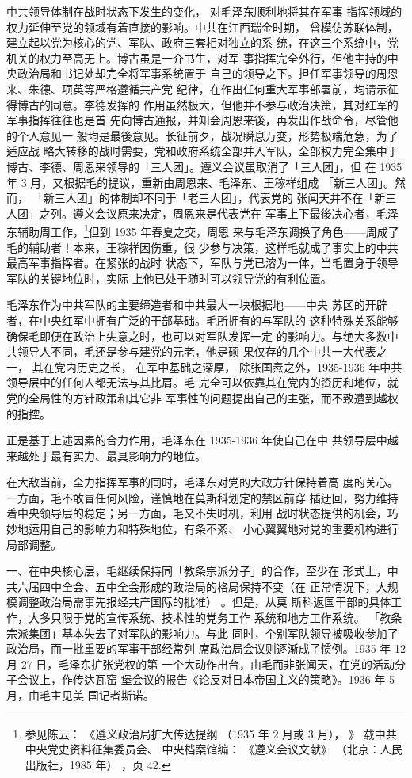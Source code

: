 中共领导体制在战时状态下发生的变化，
对毛泽东顺利地将其在军事
指挥领域的权力延伸至党的领域有着直接的影响。中共在江西瑞金时期，
曾模仿苏联体制，建立起以党为核心的党、军队、政府三套相对独立的系
统，在这三个系统中，党机关的权力至高无上。博古虽是一介书生，对军
事指挥完全外行，但他主持的中央政治局和书记处却完全将军事系统置于
自己的领导之下。担任军事领导的周恩来、朱德、项英等严格遵循共产党
纪律，在作出任何重大军事部署前，均请示征得博古的同意。李德发挥的
作用虽然极大，但他并不参与政治决策，其对红军的军事指挥往往也是首
先向博古通报，并知会周恩来後，再发出作战命令，尽管他的个人意见一
般均是最後意见。长征前夕，战况瞬息万变，形势极端危急，为了适应战
略大转移的战时需要，党和政府系统全部并入军队，全部权力完全集中于
博古、李德、周恩来领导的「三人团」。遵义会议虽取消了「三人团」，但
在 1935 年 3 月，又根据毛的提议，重新由周恩来、毛泽东、王稼祥组成
「新三人团」。然而， 「新三人团」的体制却不同于「老三人团」，代表党的
张闻天并不在「新三人团」之列。遵义会议原来决定，周恩来是代表党在
军事上下最後决心者，毛泽东辅助周工作，\footnote{参见陈云：
《遵义政治局扩大传达提纲
（1935 年 2 月或 3 月），
》 载中共中央党史资料征集委员会、
中央档案馆编：
《遵义会议文献》
（北京：人民出版社，1985 年）
，页 42.}但到 1935 年春夏之交，周恩
来与毛泽东调换了角色——周成了毛的辅助者！本来，王稼祥因伤重，很
少参与决策，这样毛就成了事实上的中共最高军事指挥者。在紧张的战时
状态下，军队与党已溶为一体，当毛置身于领导军队的关键地位时，实际
上他已处于随时可以领导党的有利位置。
 
毛泽东作为中共军队的主要缔造者和中共最大一块根据地——中央
苏区的开辟者，在中央红军中拥有广泛的干部基础。毛所拥有的与军队的
这种特殊关系能够确保毛即便在政治上失意之时，也可以对军队发挥一定
的影响力。与绝大多数中共领导人不同，毛还是参与建党的元老，他是硕
果仅存的几个中共一大代表之一，
其在党内历史之长，
在军中基础之深厚，
除张国焘之外，1935-1936 年中共领导层中的任何人都无法与其比肩。毛
完全可以依靠其在党内的资历和地位，就党的全局性的方针政策和其它非
军事性的问题提出自己的主张，而不致遭到越权的指控。

正是基于上述因素的合力作用，毛泽东在 1935-1936 年使自己在中
共领导层中越来越处于最有实力、最具影响力的地位。

在大敌当前，全力指挥军事的同时，毛泽东对党的大政方针保持着高
度的关心。一方面，毛不敢冒任何风险，谨慎地在莫斯科划定的禁区前穿
插迂回，努力维持着中央领导层的稳定；另一方面，毛又不失时机，利用
战时状态提供的机会，巧妙地运用自己的影响力和特殊地位，有条不紊、
小心翼翼地对党的重要机构进行局部调整。

一、在中央核心层，毛继续保持同「教条宗派分子」的合作，至少在
形式上，中共六届四中全会、五中全会形成的政治局的格局保持不变（在
正常情况下，大规模调整政治局需事先报经共产国际的批准）
。但是，从莫
斯科返国干部的具体工作，大多只限于党的宣传系统、技术性的党务工作
系统和地方工作系统。
「教条宗派集团」基本失去了对军队的影响力。与此
同时，个别军队领导被吸收参加了政治局，而一批重要的军事干部经常列
席政治局会议则逐渐成了惯例。1935 年 12 月 27 日，毛泽东扩张党权的第
一个大动作出台，由毛而非张闻天，在党的活动分子会议上，作传达瓦窑
堡会议的报告《论反对日本帝国主义的策略》。1936 年 5 月，由毛主见美
国记者斯诺。

